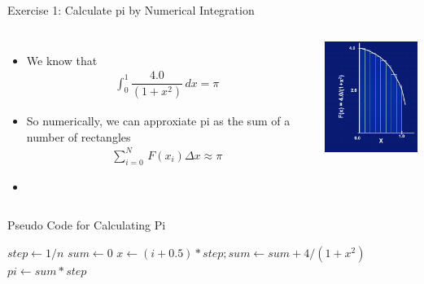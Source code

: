 \documentclass[c,mathserif,compress,xcolor=svgnames]{beamer}
\begin{document}
\setcounter{algorithm}{0}
\begin{frame}[allowframebreaks]{Exercise 1: Calculate pi by Numerical Integration}
  \begin{columns}
    \column{5cm}
    \begin{itemize}
      \item We know that
      \begin{align*}
        \int^1_0 \dfrac{4.0}{(1+x^2)}\, dx = \pi
      \end{align*}
      \item So numerically, we can approxiate pi as the sum of a number of rectangles
      \begin{align*}
        \sum^N_{i=0}\,F(x_i)\Delta x \approx \pi
      \end{align*}
      \item[] 
    \end{itemize}
    \column{5cm}
    \begin{center}
      \includegraphics[width=4cm]{./pi}
    \end{center}
  \end{columns}

  \begin{algorithm}[H]
    \caption{Pseudo Code for Calculating Pi}
    \begin{algorithmic}
        \State $step \gets 1/n$
        \State $sum \gets 0$
        \State $x \gets (i+0.5)*step; sum \gets sum + 4/(1+x^2)$
        \EndDo
        \State $pi \gets sum * step$
        \EndFunction
    \end{algorithmic}
  \end{algorithm}
\end{frame}
\end{document}
